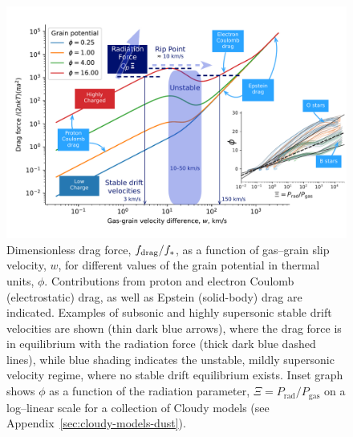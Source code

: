 \begin{figure}
  \includegraphics[width=\linewidth]{figs/gas-grain-drag-photoionized}
  \caption{Dimensionless drag force, \(f_{\text{drag}} / f_*\), as a function
    of gas--grain slip velocity, \(w\), for different values of the
    grain potential in thermal units, \(\phi\).  Contributions from
    proton and electron Coulomb (electrostatic) drag, as well as
    Epstein (solid-body) drag are indicated.  Examples of subsonic and
    highly supersonic stable drift velocities are shown (thin dark
    blue arrows), where the drag force is in equilibrium with the
    radiation force (thick dark blue dashed lines), while blue shading
    indicates the unstable, mildly supersonic velocity regime, where
    no stable drift equilibrium exists.  Inset graph shows \(\phi\) as a
    function of the radiation parameter,
    \(\Xi = P_{\mathrm{rad}} / P_{\mathrm{gas}}\) on a log--linear scale
    for a collection of Cloudy models (see
    Appendix~\ref{sec:cloudy-models-dust}).}
  \label{fig:gas-grain-drag-photoionized}
\end{figure}



